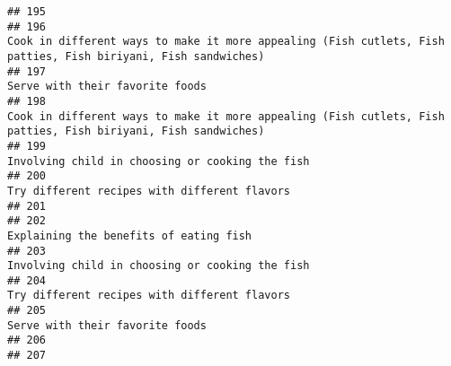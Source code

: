 \documentclass[
]{article}
\begin{document}
\begin{verbatim}
## 195                                                                                                                                                                                                             
## 196                                                                                                Cook in different ways to make it more appealing (Fish cutlets, Fish patties, Fish biriyani, Fish sandwiches)
## 197                                                                                                                                                                              Serve with their favorite foods
## 198                                                                                                Cook in different ways to make it more appealing (Fish cutlets, Fish patties, Fish biriyani, Fish sandwiches)
## 199                                                                                                                                                              Involving child in choosing or cooking the fish
## 200                                                                                                                                                                 Try different recipes with different flavors
## 201                                                                                                                                                                                                             
## 202                                                                                                                                                                       Explaining the benefits of eating fish
## 203                                                                                                                                                              Involving child in choosing or cooking the fish
## 204                                                                                                                                                                 Try different recipes with different flavors
## 205                                                                                                                                                                              Serve with their favorite foods
## 206                                                                                                                                                                                                             
## 207                                                                                                                                                                                                             

\end{verbatim}
\end{document}
